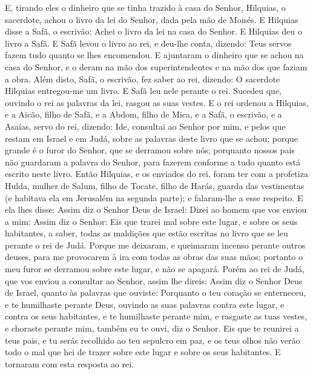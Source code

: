 E, tirando eles o dinheiro que se tinha trazido à casa do Senhor,
Hilquias, o sacerdote, achou o livro da lei do Senhor, dada pela mão
de Moisés. E Hilquias disse a Safã, o escrivão: Achei o livro
da lei na casa do Senhor. E Hilquias deu o livro a Safã. E
Safã levou o livro ao rei, e deu-lhe conta, dizendo: Teus servos
fazem tudo quanto se lhes encomendou. E ajuntaram o dinheiro
que se achou na casa do Senhor, e o deram na mão dos
superintendentes e na mão dos que faziam a obra. Além disto,
Safã, o escrivão, fez saber ao rei, dizendo: O sacerdote Hilquias
entregou-me um livro. E Safã leu nele perante o rei. Sucedeu
que, ouvindo o rei as palavras da lei, rasgou as suas vestes.
E o rei ordenou a Hilquias, e a Aicão, filho de Safã, e a
Abdom, filho de Mica, e a Safã, o escrivão, e a Asaías, servo do
rei, dizendo: Ide, consultai ao Senhor por mim, e pelos que
restam em Israel e em Judá, sobre as palavras deste livro que se
achou; porque grande é o furor do Senhor, que se derramou sobre nós;
porquanto nossos pais não guardaram a palavra do Senhor, para
fazerem conforme a tudo quanto está escrito neste livro.
Então Hilquias, e os enviados do rei, foram ter com a
profetiza Hulda, mulher de Salum, filho de Tocate, filho de Harás,
guarda das vestimentas (e habitava ela em Jerusalém na segunda
parte); e falaram-lhe a esse respeito. E ela lhes disse:
Assim diz o Senhor Deus de Israel: Dizei ao homem que vos enviou a
mim: Assim diz o Senhor: Eis que trarei mal sobre este lugar,
e sobre os seus habitantes, a saber, todas as maldições que estão
escritas no livro que se leu perante o rei de Judá. Porque me
deixaram, e queimaram incenso perante outros deuses, para me
provocarem à ira com todas as obras das suas mãos; portanto o meu
furor se derramou sobre este lugar, e não se apagará. Porém
ao rei de Judá, que vos enviou a consultar ao Senhor, assim lhe
direis: Assim diz o Senhor Deus de Israel, quanto às palavras que
ouviste: Porquanto o teu coração se enterneceu, e te
humilhaste perante Deus, ouvindo as suas palavras contra este lugar,
e contra os seus habitantes, e te humilhaste perante mim, e rasgaste
as tuas vestes, e choraste perante mim, também eu te ouvi, diz o
Senhor. Eis que te reunirei a teus pais, e tu serás recolhido
ao teu sepulcro em paz, e os teus olhos não verão todo o mal que hei
de trazer sobre este lugar e sobre os seus habitantes. E tornaram
com esta resposta ao rei.

